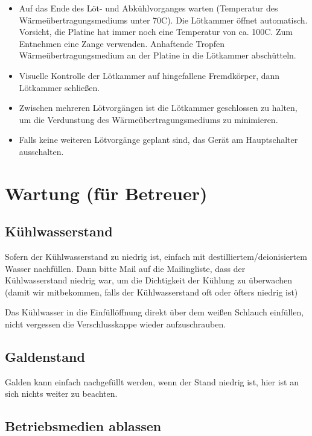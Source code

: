 \documentclass{\basedir/fablab-document}
\begin{document}
\begin{itemize}
	\item Auf das Ende des L{\"o}t- und Abk{\"u}hlvorganges warten (Temperatur des W{\"a}rme{\"u}bertragungsmediums unter 70\textdegree C). Die L{\"o}tkammer {\"o}ffnet automatisch. Vorsicht, die Platine hat immer noch eine Temperatur von ca. 100\textdegree C. Zum Entnehmen eine Zange verwenden. Anhaftende Tropfen W{\"a}rme{\"u}bertragungsmedium an der Platine in die L{\"o}tkammer absch{\"u}tteln.
	\item Visuelle Kontrolle der L{\"o}tkammer auf hingefallene Fremdk{\"o}rper, dann L{\"o}tkammer schlie{\ss}en. 
	\item Zwischen mehreren L{\"o}tvorg{\"a}ngen ist die L{\"o}tkammer geschlossen zu halten, um die Verdunstung des W{\"a}rme{\"u}bertragungsmediums zu minimieren.
	\item Falls keine weiteren L{\"o}tvorg{\"a}nge geplant sind, das Ger{\"a}t am Hauptschalter ausschalten. 
	
	\end{itemize}	
	
	\section{Wartung (f{\"u}r Betreuer)}
	
	\subsection{K{\"u}hlwasserstand}
	
	Sofern der K{\"u}hlwasserstand zu niedrig ist, einfach mit destilliertem/deionisiertem Wasser nachf{\"u}llen. Dann bitte Mail auf die Mailingliste, dass der K{\"u}hlwasserstand niedrig war, um die Dichtigkeit der K{\"u}hlung zu {\"u}berwachen (damit wir mitbekommen, falls der K{\"u}hlwasserstand oft oder {\"o}fters niedrig ist)
	
	 Das K{\"u}hlwasser in die Einf{\"u}ll{\"o}ffnung direkt {\"u}ber dem wei{\ss}en Schlauch einf{\"u}llen, nicht vergessen die Verschlusskappe wieder aufzuschrauben.
	
	\subsection{Galdenstand}	
	
	Galden kann einfach nachgef{\"u}llt werden, wenn der Stand niedrig ist, hier ist an sich nichts weiter zu beachten. 
	
	\subsection{Betriebsmedien ablassen}
	
\end{document}
